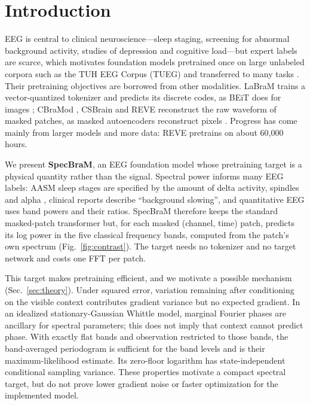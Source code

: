 \section{Introduction}
EEG is central to clinical neuroscience---sleep staging, screening for abnormal background
activity, studies of depression and cognitive load---but expert labels are scarce, which
motivates foundation models pretrained once on large unlabeled corpora such as the TUH EEG
Corpus (TUEG) \cite{obeid2016tuh} and transferred to many tasks
\cite{jiang2024labram,wang2025cbramod,csbrain,reve2025}. Their pretraining objectives are
borrowed from other modalities. LaBraM \cite{jiang2024labram} trains a vector-quantized
tokenizer and predicts its discrete codes, as BEiT does for images \cite{bao2022beit}; CBraMod
\cite{wang2025cbramod}, CSBrain \cite{csbrain} and REVE \cite{reve2025} reconstruct the raw
waveform of masked patches, as masked autoencoders reconstruct pixels \cite{he2022mae}. Progress
has come mainly from larger models and more data: REVE pretrains on about 60{,}000 hours.

We present \textbf{SpecBraM}, an EEG foundation model whose pretraining target is a physical
quantity rather than the signal. Spectral power informs many EEG labels: AASM sleep
stages are specified by the amount of delta activity, spindles and alpha
\cite{berry2017aasm}, clinical reports describe ``background slowing'', and quantitative EEG
uses band powers and their ratios. SpecBraM therefore keeps the standard masked-patch
transformer but, for each masked (channel, time) patch, predicts its log power in the five
classical frequency bands, computed from the patch's own spectrum (Fig.~\ref{fig:contrast}). The
target needs no tokenizer and no target network and costs one FFT per patch.

This target makes pretraining efficient, and we motivate a possible mechanism
(Sec.~\ref{sec:theory}). Under squared error, variation remaining after conditioning on the
visible context contributes gradient variance but no expected gradient. In an idealized
stationary-Gaussian Whittle model, marginal Fourier phases are ancillary for spectral
parameters; this does not imply that context cannot predict phase. With exactly flat bands
and observation restricted to those bands, the band-averaged periodogram is sufficient for
the band levels and is their maximum-likelihood estimate. Its zero-floor logarithm has
state-independent conditional sampling variance. These properties motivate a compact spectral
target, but do not prove lower gradient noise or faster optimization for the implemented model.


